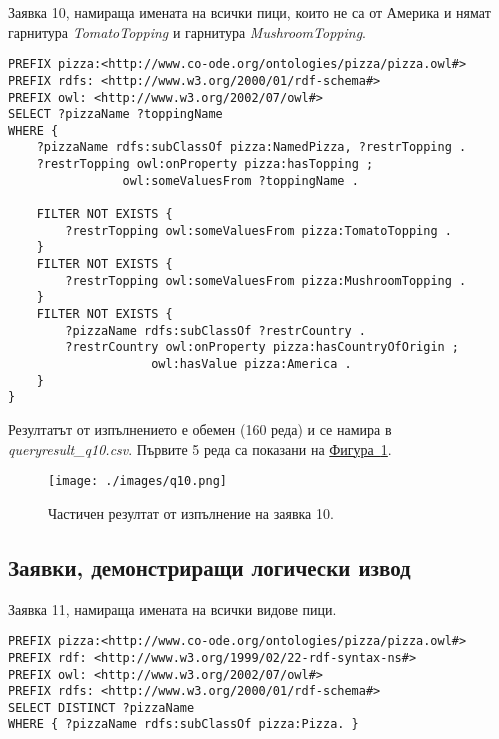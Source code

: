 \documentclass[12pt]{article}
\begin{document}
\clearpage
\pagebreak

        Заявка 10, намираща имената на всички пици, които не са от Америка и нямат гарнитура \textit{TomatoTopping} и гарнитура \textit{MushroomTopping}.
        
        \begin{lstlisting}[language=SPARQL,style=sparql]
PREFIX pizza:<http://www.co-ode.org/ontologies/pizza/pizza.owl#>
PREFIX rdfs: <http://www.w3.org/2000/01/rdf-schema#>
PREFIX owl: <http://www.w3.org/2002/07/owl#>
SELECT ?pizzaName ?toppingName
WHERE {
    ?pizzaName rdfs:subClassOf pizza:NamedPizza, ?restrTopping .
    ?restrTopping owl:onProperty pizza:hasTopping ;
                owl:someValuesFrom ?toppingName .
    
    FILTER NOT EXISTS {
        ?restrTopping owl:someValuesFrom pizza:TomatoTopping .
    }
    FILTER NOT EXISTS {
        ?restrTopping owl:someValuesFrom pizza:MushroomTopping .
    }
    FILTER NOT EXISTS {
        ?pizzaName rdfs:subClassOf ?restrCountry .
        ?restrCountry owl:onProperty pizza:hasCountryOfOrigin ;
                    owl:hasValue pizza:America .
    }
}\end{lstlisting}

        Резултатът от изпълнението е обемен (160 реда) и се намира в \textit{query\-result\_q10.csv}. Първите 5 реда са показани на \hyperref[fig:q10]{Фигура~\ref*{fig:q10}}.

        \begin{center}
            \begin{figure}
            \centering
                \texttt{[image: ./images/q10.png]}
                \caption{Частичен резултат от изпълнение на заявка 10.}
                \label{fig:q10}
            \end{figure}
        \end{center}
        
\clearpage
\pagebreak

    \subsection{Заявки, демонстриращи логически извод}

        Заявка 11, намираща имената на всички видове пици.
        
        \begin{lstlisting}[language=SPARQL,style=sparql]
PREFIX pizza:<http://www.co-ode.org/ontologies/pizza/pizza.owl#>
PREFIX rdf: <http://www.w3.org/1999/02/22-rdf-syntax-ns#>
PREFIX owl: <http://www.w3.org/2002/07/owl#>
PREFIX rdfs: <http://www.w3.org/2000/01/rdf-schema#>
SELECT DISTINCT ?pizzaName
WHERE { ?pizzaName rdfs:subClassOf pizza:Pizza. }\end{lstlisting}
\end{document}
